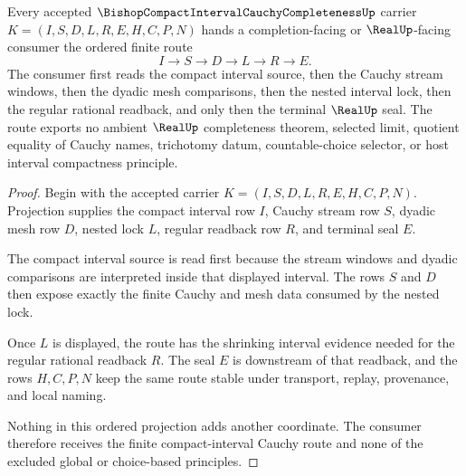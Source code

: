 \begin{theorem}
\label{thm:bishop-compact-interval-cauchy-completeness-cauchy-limit-route}
Every accepted $\BishopCompactIntervalCauchyCompletenessUp$ carrier $K=(I,S,D,L,R,E,H,C,P,N)$ hands a completion-facing or $\RealUp$-facing consumer the ordered finite route
$$
I \longrightarrow S \longrightarrow D \longrightarrow L \longrightarrow R \longrightarrow E .
$$
The consumer first reads the compact interval source, then the Cauchy stream windows, then the dyadic mesh comparisons, then the nested interval lock, then the regular rational readback, and only then the terminal $\RealUp$ seal. The route exports no ambient $\RealUp$ completeness theorem, selected limit, quotient equality of Cauchy names, trichotomy datum, countable-choice selector, or host interval compactness principle.
\end{theorem}
\begin{proof}
Begin with the accepted carrier $K=(I,S,D,L,R,E,H,C,P,N)$. Projection supplies the compact interval row $I$, Cauchy stream row $S$, dyadic mesh row $D$, nested lock $L$, regular readback row $R$, and terminal seal $E$.

The compact interval source is read first because the stream windows and dyadic comparisons are interpreted inside that displayed interval. The rows $S$ and $D$ then expose exactly the finite Cauchy and mesh data consumed by the nested lock.

Once $L$ is displayed, the route has the shrinking interval evidence needed for the regular rational readback $R$. The seal $E$ is downstream of that readback, and the rows $H,C,P,N$ keep the same route stable under transport, replay, provenance, and local naming.

Nothing in this ordered projection adds another coordinate. The consumer therefore receives the finite compact-interval Cauchy route and none of the excluded global or choice-based principles.
\end{proof}

